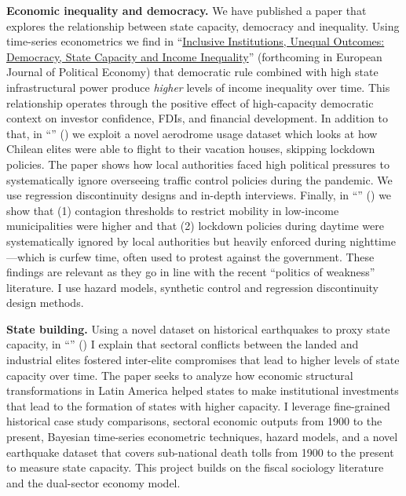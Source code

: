 {\bf Economic inequality and democracy.} We have published a paper that explores the relationship between state capacity, democracy and inequality. Using time-series econometrics we find in ``\href{https://github.com/hbahamonde/Inequality_State_Capacity/raw/main/Bahamonde_Trasberg.pdf}{Inclusive Institutions, Unequal Outcomes: Democracy, State Capacity and Income Inequality}'' {\unskip} (forthcoming in European Journal of Political Economy) that democratic rule combined with high state infrastructural power produce \emph{higher} levels of income inequality over time. This relationship operates through the positive effect of high-capacity democratic context on investor confidence, FDIs, and financial development. In addition to that, in ``\href{https://raw.githubusercontent.com/hbahamonde/Tobalaba/master/abstract.txt}{{\unskip}}'' (\emph{\unskip}) we exploit a novel aerodrome usage dataset which looks at how Chilean elites were able to flight to their vacation houses, skipping lockdown policies. The paper shows how local authorities faced high political pressures to systematically ignore overseeing traffic control policies during the pandemic. We use regression discontinuity designs and in-depth interviews. Finally, in ``\href{https://github.com/hbahamonde/Bus/raw/main/abstract.txt}{{\unskip}}'' (\emph{\unskip}) we show that (1) contagion thresholds to restrict mobility in low-income municipalities were higher and that (2) lockdown policies during daytime were systematically ignored by local authorities but heavily enforced during nighttime---which is curfew time, often used to protest against the government. These findings are relevant as they go in line with the recent ``politics of weakness'' literature. I use hazard models, synthetic control and regression discontinuity design methods.

{\bf State building.} Using a novel dataset on historical earthquakes to proxy state capacity, in ``\href{https://github.com/hbahamonde/Earthquake_Paper/raw/master/Bahamonde_Earthquake_Paper.pdf}{{\unskip}}'' ({\unskip}) I explain that sectoral conflicts between the landed and industrial elites fostered inter-elite compromises that lead to higher levels of state capacity over time. The paper seeks to analyze how economic structural transformations in Latin America helped states to make institutional investments that lead to the formation of states with higher capacity. I leverage fine-grained historical case study comparisons, sectoral economic outputs from 1900 to the present, Bayesian time-series econometric techniques, hazard models, and a novel earthquake dataset that covers sub-national death tolls from 1900 to the present to measure state capacity. This project builds on the fiscal sociology literature and the dual-sector economy model. 


